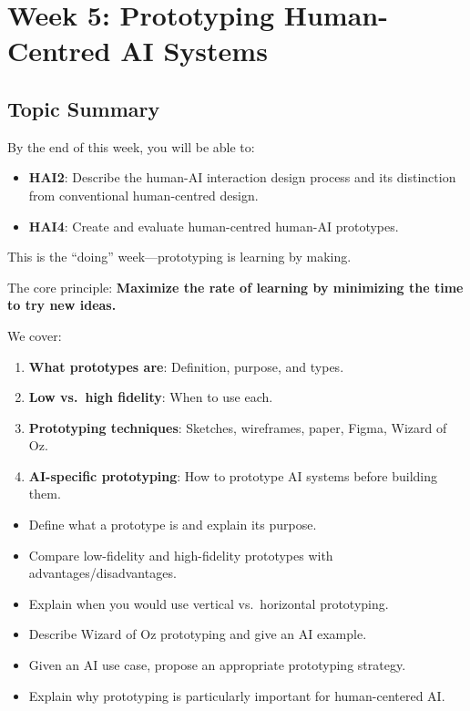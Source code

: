 \section{Week 5: Prototyping Human-Centred AI Systems}

\subsection{Topic Summary}

\begin{keybox}
By the end of this week, you will be able to:
\begin{itemize}
  \item \textbf{HAI2}: Describe the human-AI interaction design process and its distinction from conventional human-centred design.
  \item \textbf{HAI4}: Create and evaluate human-centred human-AI prototypes.
\end{itemize}
\end{keybox}

\begin{keybox}
This is the ``doing'' week---prototyping is learning by making.

The core principle: \textbf{Maximize the rate of learning by minimizing the time to try new ideas.}

We cover:
\begin{enumerate}
  \item \textbf{What prototypes are}: Definition, purpose, and types.
  \item \textbf{Low vs.\ high fidelity}: When to use each.
  \item \textbf{Prototyping techniques}: Sketches, wireframes, paper, Figma, Wizard of Oz.
  \item \textbf{AI-specific prototyping}: How to prototype AI systems before building them.
\end{enumerate}
\end{keybox}

\begin{keybox}
\begin{itemize}
  \item Define what a prototype is and explain its purpose.
  \item Compare low-fidelity and high-fidelity prototypes with advantages/disadvantages.
  \item Explain when you would use vertical vs.\ horizontal prototyping.
  \item Describe Wizard of Oz prototyping and give an AI example.
  \item Given an AI use case, propose an appropriate prototyping strategy.
  \item Explain why prototyping is particularly important for human-centered AI.
\end{itemize}
\end{keybox}


